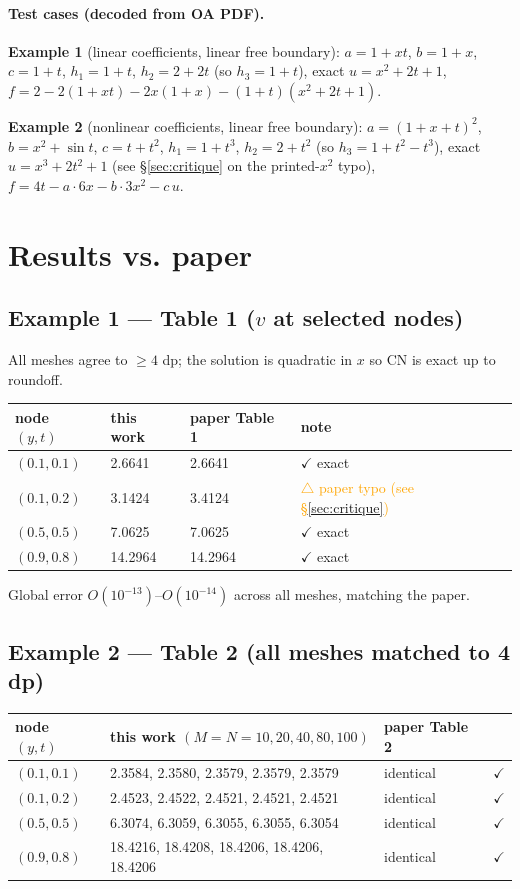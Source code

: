 \documentclass[11pt]{article}
\begin{document}
\paragraph{Test cases (decoded from OA PDF).}
\textbf{Example 1} (linear coefficients, linear free boundary):
$a=1+xt$, $b=1+x$, $c=1+t$, $h_1=1+t$, $h_2=2+2t$ (so $h_3=1+t$),
exact $u=x^{2}+2t+1$,
$f = 2 - 2(1+xt) - 2x(1+x) - (1+t)(x^{2}+2t+1)$.

\textbf{Example 2} (nonlinear coefficients, linear free boundary):
$a=(1+x+t)^{2}$, $b=x^{2}+\sin t$, $c=t+t^{2}$, $h_1=1+t^{3}$, $h_2=2+t^{2}$
(so $h_3 = 1+t^{2}-t^{3}$), exact $u=x^{3}+2t^{2}+1$
(see \S\ref{sec:critique} on the printed-$x^{2}$ typo),
$f = 4t - a\cdot 6x - b\cdot 3x^{2} - c\,u$.

\section{Results vs. paper}

\subsection{Example 1 --- Table 1 (\texorpdfstring{$v$}{v} at selected nodes)}
All meshes agree to $\ge 4$ dp; the solution is quadratic in $x$ so CN is exact
up to roundoff.
\begin{center}
\begin{tabular}{llll}
\toprule
node $(y,t)$ & this work & paper Table 1 & note \\
\midrule
$(0.1,0.1)$ & 2.6641 & 2.6641 & $\checkmark$ exact \\
$(0.1,0.2)$ & 3.1424 & 3.4124 & \textcolor{orange}{$\triangle$ paper typo (see \S\ref{sec:critique})} \\
$(0.5,0.5)$ & 7.0625 & 7.0625 & $\checkmark$ exact \\
$(0.9,0.8)$ & 14.2964 & 14.2964 & $\checkmark$ exact \\
\bottomrule
\end{tabular}
\end{center}
Global error $O(10^{-13})$--$O(10^{-14})$ across all meshes, matching the paper.

\subsection{Example 2 --- Table 2 (all meshes matched to 4 dp)}
\begin{center}
\small
\begin{tabular}{llll}
\toprule
node $(y,t)$ & this work $(M{=}N{=}10,20,40,80,100)$ & paper Table 2 & \\
\midrule
$(0.1,0.1)$ & 2.3584, 2.3580, 2.3579, 2.3579, 2.3579 & identical & $\checkmark$ \\
$(0.1,0.2)$ & 2.4523, 2.4522, 2.4521, 2.4521, 2.4521 & identical & $\checkmark$ \\
$(0.5,0.5)$ & 6.3074, 6.3059, 6.3055, 6.3055, 6.3054 & identical & $\checkmark$ \\
$(0.9,0.8)$ & 18.4216, 18.4208, 18.4206, 18.4206, 18.4206 & identical & $\checkmark$ \\
\bottomrule
\end{tabular}
\end{center}
\end{document}
